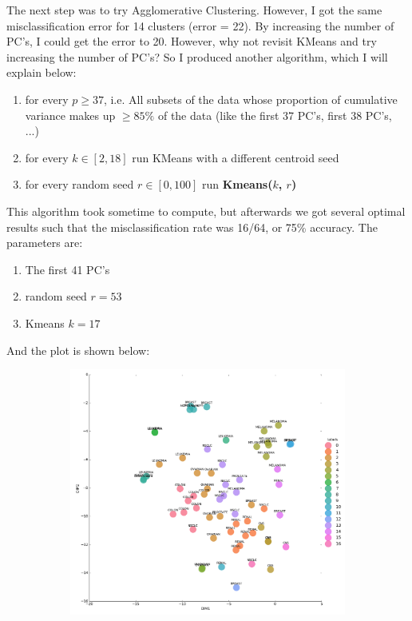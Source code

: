 \documentclass[20pt]{article} %
\begin{document}
The next step was to try Agglomerative Clustering.  However, I got the same misclassification error for 14 clusters (error = 22).  By increasing the number of PC's, I could get the error to 20.  However, why not revisit KMeans and try increasing the number of PC's?  So I produced another algorithm, which I will explain below:
\begin{enumerate}
\item for every $p \geq 37$, i.e. All subsets of the data whose proportion of cumulative variance makes up $\geq 85\%$ of the data (like the first 37 PC's, first 38 PC's, ...)
\item for every $k \in [2, 18]$ run KMeans with a different centroid seed
\item for every random seed $r \in [0,100]$ run \textbf{Kmeans($k$, $r$)}
\end{enumerate}
\newpage
This algorithm took sometime to compute, but afterwards we got several optimal results such that the misclassification rate was 16/64, or 75\% accuracy.  The parameters are: 
\begin{enumerate}
\item The first 41 PC's
\item random seed $r = 53$
\item Kmeans $k = 17$
\end{enumerate}
And the plot is shown below:
\begin{figure}[!htbp]
  	\centering
   	\begin{subfigure}[p]{1.2\linewidth}
    	\includegraphics[width=\linewidth]{./figures/best_clustering_labels1.png}
   	\end{subfigure}
\end{figure}
\newpage
\end{document}
